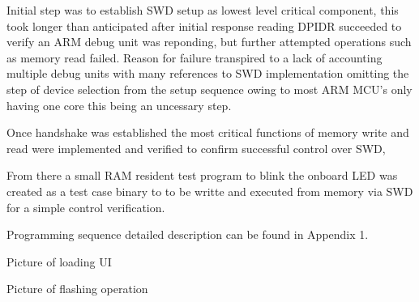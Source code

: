 Initial step was to establish SWD setup as lowest level critical component, this took longer than anticipated after initial response reading DPIDR succeeded to verify an ARM debug unit was reponding, but further attempted operations such as memory read failed. Reason for failure transpired to a lack of accounting multiple debug units\cite{RaspberryPiPico} with many references to SWD implementation omitting the step of device selection from the setup sequence owing to most ARM MCU's only having one core this being an uncessary step.

Once handshake was established the most critical functions of memory write and read were implemented and verified to confirm successful control over SWD, 

From there a small RAM resident test program to blink the onboard LED was created as a test case binary to to be writte and executed from memory via SWD for a simple control verification.

Programming sequence detailed description can be found in Appendix 1.


Picture of loading UI

Picture of flashing operation

